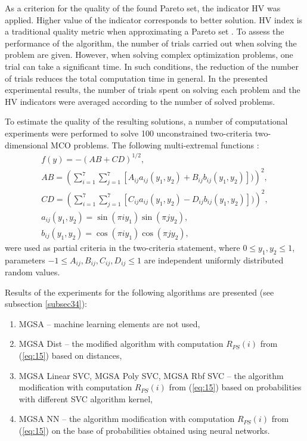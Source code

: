 \documentclass[runningheads]{llncs}
\begin{document}
As a criterion for the quality of the found Pareto set, the indicator HV was applied. Higher value of the indicator corresponds to better solution. 
HV index is a traditional quality metric when approximating a Pareto set \cite{Evtushenko2014,pymoo,AGP_ML}.
To assess the performance of the algorithm, the number of trials carried out when solving the problem are given. However, when solving complex optimization problems, one trial can take a significant time. In such conditions, the reduction of the number of trials reduces the total computation time in general. In the presented experimental results, the number of trials spent on solving each problem and the HV indicators were averaged according to the number of solved problems.

To estimate the quality of the resulting solutions, a number of computational experiments were performed to solve 100 unconstrained two-criteria two-dimensional MCO problems. The following multi-extremal functions \cite{Gergel2019_2}:
\begin{equation}
    \label{eq:16}
		\begin{matrix}
		  f(y)= -(AB + CD)^{1/2}, \\
			AB =(\sum_{i=1}^7{\sum_{j=1}^7{[A_{ij} a_{ij} (y_1,y_2) + B_{ij} b_{ij} (y_1,y_2)])}})^2, \\
			CD =(\sum_{i=1}^7{\sum_{j=1}^7{[C_{ij} a_{ij} (y_1,y_2) - D_{ij} b_{ij} (y_1,y_2)])}})^2, \\
			a_{ij} (y_1,y_2) = \sin(\pi i y_1) \sin(\pi j y_2), \\
			b_{ij} (y_1,y_2) = \cos(\pi i y_1) \cos(\pi j y_2),
		\end{matrix}
\end{equation}
were used as partial criteria in the two-criteria statement, where $0 \leq y_1, y_2 \leq 1$, parameters $-1 \leq A_{ij},B_{ij},C_{ij},D_{ij} \leq 1$ are independent uniformly distributed random values.

Results of the experiments for the following algorithms are presented (see subsection \ref{subsec34}):
\begin{enumerate}
	\item MGSA -- machine learning elements are not used,
	\item MGSA Dist -- the modified algorithm with computation $R_{PS}(i)$ from (\ref{eq:15}) based on distances,
	\item MGSA Linear SVC, MGSA Poly SVC, MGSA Rbf SVC -- the algorithm modification with computation $R_{PS}(i)$ from (\ref{eq:15}) based on probabilities with different SVC algorithm kernel,
	\item MGSA NN -- the algorithm modification with computation $R_{PS}(i)$ from (\ref{eq:15}) on the base of probabilities obtained using neural networks.
\end{enumerate}
	
\end{document}
